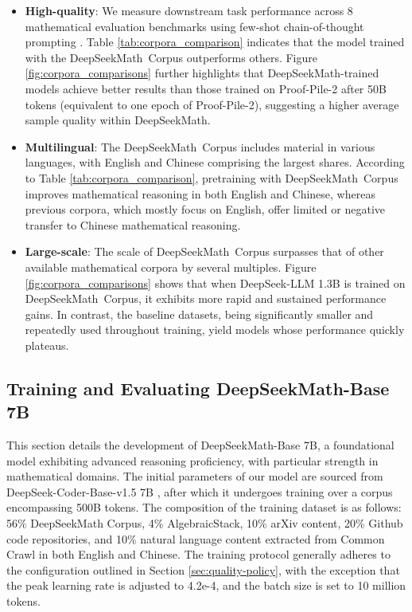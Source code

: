 \begin{itemize}[topsep=0pt]
    \item \textbf{High-quality}:
    We measure downstream task performance across 8 mathematical evaluation benchmarks using few-shot chain-of-thought prompting \cite{cot}. Table \ref{tab:corpora_comparison} indicates that the model trained with the DeepSeekMath~Corpus outperforms others. Figure \ref{fig:corpora_comparisons} further highlights that DeepSeekMath-trained models achieve better results than those trained on Proof-Pile-2 after 50B tokens (equivalent to one epoch of Proof-Pile-2), suggesting a higher average sample quality within DeepSeekMath.
    \item \textbf{Multilingual}:
    The DeepSeekMath~Corpus includes material in various languages, with English and Chinese comprising the largest shares. According to Table \ref{tab:corpora_comparison}, pretraining with DeepSeekMath~Corpus improves mathematical reasoning in both English and Chinese, whereas previous corpora, which mostly focus on English, offer limited or negative transfer to Chinese mathematical reasoning.
    \item \textbf{Large-scale}:
    The scale of DeepSeekMath~Corpus surpasses that of other available mathematical corpora by several multiples. Figure \ref{fig:corpora_comparisons} shows that when DeepSeek-LLM 1.3B is trained on DeepSeekMath~Corpus, it exhibits more rapid and sustained performance gains. In contrast, the baseline datasets, being significantly smaller and repeatedly used throughout training, yield models whose performance quickly plateaus.
\end{itemize}

\subsection{Training and Evaluating DeepSeekMath-Base 7B}

This section details the development of DeepSeekMath-Base 7B, a foundational model exhibiting advanced reasoning proficiency, with particular strength in mathematical domains. The initial parameters of our model are sourced from DeepSeek-Coder-Base-v1.5 7B \citep{deepseek-coder}, after which it undergoes training over a corpus encompassing 500B tokens. The composition of the training dataset is as follows: 56\% DeepSeekMath Corpus, 4\% AlgebraicStack, 10\% arXiv content, 20\% Github code repositories, and 10\% natural language content extracted from Common Crawl in both English and Chinese. The training protocol generally adheres to the configuration outlined in Section \ref{sec:quality-policy}, with the exception that the peak learning rate is adjusted to 4.2e-4, and the batch size is set to 10 million tokens.

